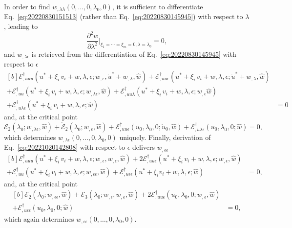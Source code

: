 \documentclass[12pt, final]{scrartcl}
\theoremstyle{definition}
\newcommand{\E}{\mathcal E}
\newcommand{\EE}{\mathcal E ^ \dagger}
\begin{document}
In order to find \(w_{,\lambda\lambda}(0, \ldots, 0, \lambda_0, 0)\), it is sufficient to differentiate Eq.~\eqref{eq:20220830151513} (rather
than Eq.~\eqref{eq:20220830145945}) with respect to \(\lambda\), leading to
\begin{equation}
  \frac{\partial^2 w}{\partial\lambda^2} \biggr\rvert_{\xi_1 = \cdots = \xi_m = 0, \lambda = \lambda_0}= 0,
\end{equation}
and \(w_{,\lambda\epsilon}\) is retrieved from the differentiation of Eq.~\eqref{eq:20220830145945} with respect to \(\epsilon\)
\begin{equation}
  \begin{aligned}[b]
    \EE_{,uuu}(u^\ast + \xi_i \, v_i + w, \lambda, \epsilon; w_{,\epsilon}, \dot{u}^\ast + w_{,\lambda}, \hat{w}) + \EE_{,uu\epsilon}(u^\ast + \xi_i \, v_i + w, \lambda, \epsilon; \dot{u}^\ast + w_{,\lambda}, \hat{w}) &\\
    + \EE_{,uu}(u^\ast + \xi_i \, v_i + w, \lambda, \epsilon; w_{,\lambda\epsilon}, \hat{w}) + \EE_{,uu\lambda}(u^\ast + \xi_i \, v_i + w, \lambda, \epsilon; w_{,\epsilon}\hat{w})&\\
    + \EE_{,u\lambda\epsilon}(u^\ast + \xi_i \, v_i + w, \lambda, \epsilon; \hat{w}) &= 0
  \end{aligned}
\end{equation}
and, at the critical point
\begin{equation}
  \E_2(\lambda_0; w_{,\lambda\epsilon}, \hat{w}) + \dot{\E}_2(\lambda_0; w_{,\epsilon}, \hat{w})  + \EE_{,uu\epsilon}(u_0, \lambda_0, 0; \mathring{u}_0, \hat{w}) + \EE_{,u\lambda\epsilon}(u_0, \lambda_0, 0; \hat{w}) = 0,
\end{equation}
which determines \(w_{,\lambda\epsilon}(0, \ldots, 0, \lambda_0, 0)\) uniquely. Finally, derivation of Eq.~\eqref{eq:20221020142808} with
respect to \(\epsilon\) delivers \(w_{,\epsilon\epsilon}\)
\begin{equation}
  \begin{aligned}[b]
    \EE_{,uuu}(u^\ast + \xi_i \, v_i + w, \lambda, \epsilon; w_{,\epsilon}, w_{,\epsilon}, \hat{w}) + 2\EE_{,uu\epsilon}(u^\ast + \xi_i \, v_i + w, \lambda, \epsilon; w_{,\epsilon}, \hat{w}) &\\
    + \EE_{,uu}(u^\ast + \xi_i \, v_i + w, \lambda, \epsilon; w_{,\epsilon\epsilon}, \hat{w}) + \EE_{,u\epsilon\epsilon}(u^\ast + \xi_i v_i + w, \lambda, \epsilon; \hat{w}) &= 0,
  \end{aligned}
\end{equation}
and, at the critical point
\begin{equation}
  \begin{aligned}[b]
    \E_2(\lambda_0; w_{,\epsilon\epsilon}, \hat{w}) + \E_3(\lambda_0; w_{,\epsilon}, w_{,\epsilon}, \hat{w}) + 2\EE_{,uu\epsilon}(u_0, \lambda_0, 0; w_{,\epsilon}, \hat{w})&\\
    + \EE_{,u\epsilon\epsilon}(u_0, \lambda_0, 0; \hat{w}) &= 0,
  \end{aligned}
\end{equation}
which again determines \(w_{,\epsilon\epsilon}(0, \ldots, 0, \lambda_0, 0)\).
\end{document}
